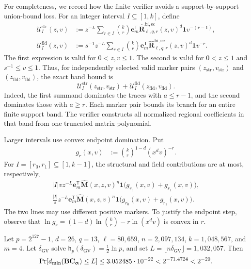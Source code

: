 For completeness, we record how the finite verifier avoids a support-by-support
union-bound loss.  For an integer interval $I\subseteq[1,k]$, define
\begin{align}
 \mathcal U_I^{\mathrm{str}}(z,v)
 &:={z^{-L}}\sum_{r\in I}\binom{k}{r}
 \mathbf e_m^{\mathsf T}
 \widehat{\mathbf R}^{\mathrm{bi,ec}}_{\ell,q,r}(z,v)^d\boldsymbol 1
 v^{-(r-1)},
 \label{eq:prime-ec-exact-band-structural}\\
 \mathcal U_I^{\mathrm{fld}}(z,v)
 &:={s^{-1}z^{-L}}\sum_{r\in I}\binom{k}{r}
 \mathbf e_m^{\mathsf T}
 \widehat{\mathbf R}^{\mathrm{bi,ec}}_{\ell,q,r}(z,v)^d\boldsymbol 1
 v^{-r}.
 \label{eq:prime-ec-exact-band-field}
\end{align}
The first expression is valid for $0<z,v\leq1$.  The second is valid for
$0<z\leq1$ and $s^{-1}\leq v\leq1$.  Thus, for independently selected
valid marker pairs $(z_{\mathrm{str}},v_{\mathrm{str}})$ and
$(z_{\mathrm{fld}},v_{\mathrm{fld}})$, the exact band bound is
\begin{equation}
 \mathcal U_I^{\mathrm{str}}(z_{\mathrm{str}},v_{\mathrm{str}})
 +\mathcal U_I^{\mathrm{fld}}(z_{\mathrm{fld}},v_{\mathrm{fld}}).
 \label{eq:prime-ec-exact-band}
\end{equation}
Indeed, the first summand dominates the traces with $a\leq r-1$, and the
second dominates those with $a\geq r$.  Each marker pair bounds its branch
for an entire finite support band.  The verifier constructs all normalized
regional coefficients in that band from one truncated matrix polynomial.

Larger intervals use convex endpoint domination.  Put
\begin{align}
 g_r(x,v)&:=\binom{k}{r}^{1-d}(x^dv)^{-r}.
\end{align}
For $I=[r_0,r_1]\subseteq[1,k-1]$, the structural and field contributions
are at most, respectively,
\begin{align}
 |I|vz^{-L}\mathbf e_m^{\mathsf T}\widehat{\mathbf M}(x,z,v)^n\boldsymbol 1
   \bigl(g_{r_0}(x,v)+g_{r_1}(x,v)\bigr),
 \label{eq:prime-ec-structural-block}\\
 \frac{|I|}{s}z^{-L}\mathbf e_m^{\mathsf T}\widehat{\mathbf M}(x,z,v)^n\boldsymbol 1
   \bigl(g_{r_0}(x,v)+g_{r_1}(x,v)\bigr).
 \label{eq:prime-ec-field-block}
\end{align}
The two lines may use different positive markers.  To justify the endpoint
step, observe that
$\ln g_r=(1-d)\ln\binom{k}{r}-r\ln(x^dv)$ is convex in $r$.

\begin{corollary}
\label{cor:prime-ec-biregular-finite-certificate}
Let $p=2^{127}-1$, $d=26$, $q=13$, $\ell=80{,}659$,
$n=2{,}097{,}134$, $k=1{,}048{,}567$, and $m=4$.  Let
$\delta_{\mathrm{GV}}$ solve
$\mathsf h_p(\delta_{\mathrm{GV}})=\tfrac12\ln p$, and set
$L=\lfloor n\delta_{\mathrm{GV}}\rfloor=1{,}032{,}057$.  Then
\begin{equation}
 \Pr[d_{\min}(\mathbf B\mathbf C_{\boldsymbol\alpha})\leq L]
 \leq 3.052485\cdot10^{-22}
 <2^{-71.4724}<2^{-20}.
 \label{eq:prime-ec-biregular-finite-certificate}
\end{equation}
\end{corollary}

